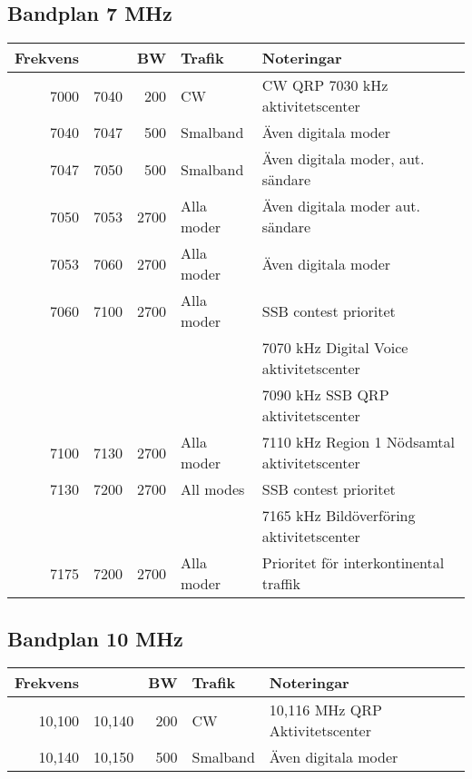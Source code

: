 \begin{landscape}
\subsection{Bandplan 7 MHz}
\begin{tabular}{rrrll}
\textbf{Frekvens} &      & \textbf{BW} & \textbf{Trafik} & \textbf{Noteringar}                          \\ \hline
7000              & 7040 & 200         & CW              & CW QRP 7030 kHz aktivitetscenter             \\ \hline
7040              & 7047 & 500         & Smalband        & Även digitala moder                          \\ \hline
7047              & 7050 & 500         & Smalband        & Även digitala moder, aut. sändare            \\ \hline
7050              & 7053 & 2700        & Alla moder      & Även digitala moder aut. sändare             \\ \hline
7053              & 7060 & 2700        & Alla moder      & Även digitala moder                          \\ \hline
7060              & 7100 & 2700        & Alla moder      & SSB contest prioritet                        \\ 
                  &      &             &                 & 7070 kHz Digital Voice aktivitetscenter      \\
                  &      &             &                 & 7090 kHz SSB QRP aktivitetscenter            \\ \hline
7100              & 7130 & 2700        & Alla moder      & 7110 kHz Region 1 Nödsamtal aktivitetscenter \\ \hline
7130              & 7200 & 2700        & All modes       & SSB contest prioritet                        \\
                  &      &             &                 & 7165 kHz Bildöverföring aktivitetscenter     \\\hline
7175              & 7200 & 2700        & Alla moder      & Prioritet för interkontinental traffik       \\ \hline
\end{tabular}
\clearpage

\subsection{Bandplan 10 MHz}
\begin{tabular}{rrrll}
\textbf{Frekvens} &        & \textbf{BW} & \textbf{Trafik} & \textbf{Noteringar}             \\ \hline
10,100            & 10,140 & 200         & CW              & 10,116 MHz QRP Aktivitetscenter \\ \hline
10,140            & 10,150 & 500         & Smalband        & Även digitala moder             \\ \hline
\end{tabular}
\clearpage


\end{landscape}
